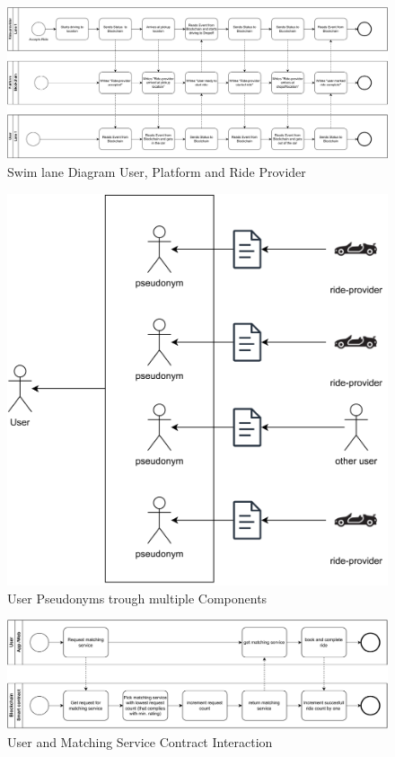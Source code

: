 \begin{figure}
    \centering
    \includegraphics[width=\linewidth]{data/1.svg}
    \caption{Swim lane Diagram User, Platform and Ride Provider}
    \label{fig:directSVG}
\end{figure}





\begin{figure}
    \centering
    \includegraphics[width=\linewidth]{data/2.svg}
    \caption{User Pseudonyms trough multiple Components}
    \label{fig:directSVG}
\end{figure}




\begin{figure}
    \centering
    \includegraphics[width=\linewidth]{data/4.svg}
    \caption{User and Matching Service Contract Interaction}
    \label{fig:directSVG}
\end{figure}







